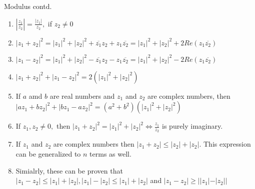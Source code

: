 \documentclass[aspectratio=169,8pt]{beamer}
\newcounter{counter}
\begin{document}
\begin{frame}{Modulus contd.}
  \begin{enumerate}
    \setcounter{enumi}{\value{counter}}
  \item $\left|\frac{z_1}{z_2}\right| = \frac{|z_1|}{z_2},$ if $z_2\neq 0$
  \item $|z_1 + z_2|^2 = |z_1|^2 + |z_2|^2 + \overline{z_1}z_2 + z_1\overline{z_2} = |z_1|^2 + |z_2|^2 + 2Re(z_1\overline{z_2})$
  \item $|z_1 - z_2|^2 = |z_1|^2 + |z_2|^2 - \overline{z_1}z_2 - z_1\overline{z_2} = |z_1|^2 + |z_2|^2 - 2Re(z_1\overline{z_2})$
  \item $|z_1 + z_2|^2 + |z_1 - z_2|^2 = 2(|z_1|^2 + |z_2|^2)$
  \item If $a$ amd $b$ are real numbers and $z_1$ and $z_2$ are complex numbers, then\\
    $|az_1 + bz_2|^2 + |bz_1 - az_2|^2 = (a^2 + b^2)(|z_1|^2 + |z_2|^2)$
  \item If $z_1, z_2\neq 0,$ then $|z_1 + z_2|^2 = |z_1|^2 + |z_2|^2 \Leftrightarrow \frac{z_1}{z_2}$ is purely imaginary.
  \item If $z_1$ and $z_2$ are complex numbers then $|z_1 + z_2|\leq |z_2| + |z_2|.$ This expression can be generalized to $n$ terms as well.
  \item Simialrly, these can be proven that $|z_1 - z_2|\leq |z_1| + |z_2|, |z_1| - |z_2|\leq |z_1| + |z_2|$ and $|z_1 - z_2|\geq ||z_1| - |z_2||$
  \end{enumerate}
\end{frame}
\end{document}
